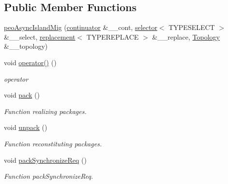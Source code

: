 \subsection*{Public Member Functions}
\begin{CompactItemize}
\item 
\hyperlink{classpeoAsyncIslandMig_e40ddd54734b018ab4e5c3f2bbd5a49c}{peo\-Async\-Island\-Mig} (\hyperlink{classcontinuator}{continuator} \&\_\-\_\-cont, \hyperlink{classselector}{selector}$<$ TYPESELECT $>$ \&\_\-\_\-select, \hyperlink{classreplacement}{replacement}$<$ TYPEREPLACE $>$ \&\_\-\_\-replace, \hyperlink{classTopology}{Topology} \&\_\-\_\-topology)
\item 
\hypertarget{classpeoAsyncIslandMig_d56e189f269dde8d68a4b007f05edaff}{
void \hyperlink{classpeoAsyncIslandMig_d56e189f269dde8d68a4b007f05edaff}{operator()} ()}
\label{classpeoAsyncIslandMig_d56e189f269dde8d68a4b007f05edaff}

\begin{CompactList}\small\item\em operator \item\end{CompactList}\item 
\hypertarget{classpeoAsyncIslandMig_0f5f1700920f9ced71ef63b0576e3f14}{
void \hyperlink{classpeoAsyncIslandMig_0f5f1700920f9ced71ef63b0576e3f14}{pack} ()}
\label{classpeoAsyncIslandMig_0f5f1700920f9ced71ef63b0576e3f14}

\begin{CompactList}\small\item\em Function realizing packages. \item\end{CompactList}\item 
\hypertarget{classpeoAsyncIslandMig_c32a27e387bcd8ce383a4cb1732dbed8}{
void \hyperlink{classpeoAsyncIslandMig_c32a27e387bcd8ce383a4cb1732dbed8}{unpack} ()}
\label{classpeoAsyncIslandMig_c32a27e387bcd8ce383a4cb1732dbed8}

\begin{CompactList}\small\item\em Function reconstituting packages. \item\end{CompactList}\item 
\hypertarget{classpeoAsyncIslandMig_0a0524a90d0b31bc4c8bfa4f39708b0f}{
void \hyperlink{classpeoAsyncIslandMig_0a0524a90d0b31bc4c8bfa4f39708b0f}{pack\-Synchronize\-Req} ()}
\label{classpeoAsyncIslandMig_0a0524a90d0b31bc4c8bfa4f39708b0f}

\begin{CompactList}\small\item\em Function pack\-Synchronize\-Req. \item\end{CompactList}\end{CompactItemize}
